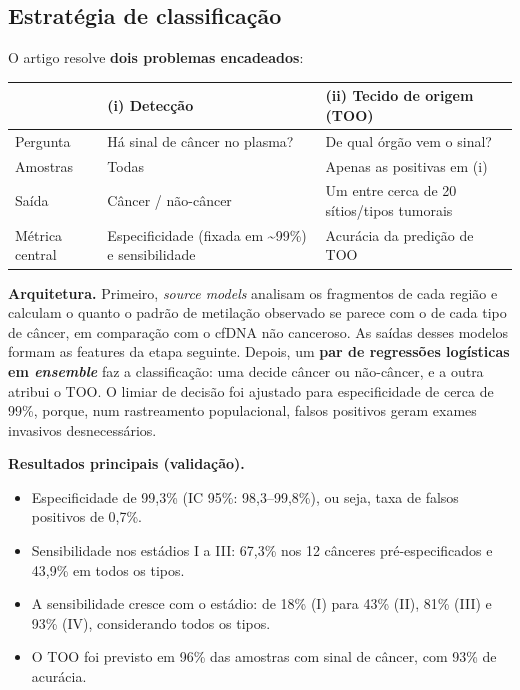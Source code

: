 \documentclass[11pt,a4paper]{article}
\providecommand{\tightlist}{\setlength{\itemsep}{0pt}\setlength{\parskip}{0pt}}
\begin{document}
\subsection{Estratégia de classificação}

O artigo resolve \textbf{dois problemas encadeados}:

{\def\LTcaptype{none} %
\begin{longtable}[]{@{}
  >{\raggedright\arraybackslash}p{}
  >{\raggedright\arraybackslash}p{}
  >{\raggedright\arraybackslash}p{}@{}}
\toprule\noalign{}
\begin{minipage}[b]{\linewidth}\raggedright
\end{minipage} & \begin{minipage}[b]{\linewidth}\raggedright
(i) Detecção
\end{minipage} & \begin{minipage}[b]{\linewidth}\raggedright
(ii) Tecido de origem (TOO)
\end{minipage} \\
\midrule\noalign{}
\endhead
\bottomrule\noalign{}
\endlastfoot
Pergunta & Há sinal de câncer no plasma? & De qual órgão vem o sinal? \\
Amostras & Todas & Apenas as positivas em (i) \\
Saída & Câncer / não-câncer & Um entre cerca de 20 sítios/tipos tumorais \\
Métrica central & Especificidade (fixada em \textasciitilde99\%) e sensibilidade
& Acurácia da predição de TOO \\
\end{longtable}
}

\textbf{Arquitetura.} Primeiro, \emph{source models} analisam os fragmentos de
cada região e calculam o quanto o padrão de metilação observado se parece com o
de cada tipo de câncer, em comparação com o cfDNA não canceroso. As saídas
desses modelos formam as features da etapa seguinte. Depois, um \textbf{par de
regressões logísticas em \emph{ensemble}} faz a classificação: uma decide câncer
ou não-câncer, e a outra atribui o TOO. O limiar de decisão foi ajustado para
especificidade de cerca de 99\%, porque, num rastreamento populacional, falsos
positivos geram exames invasivos desnecessários.

\textbf{Resultados principais (validação).}

\begin{itemize}
\tightlist
\item
  Especificidade de 99,3\% (IC 95\%: 98,3--99,8\%), ou seja, taxa de falsos
  positivos de 0,7\%.
\item
  Sensibilidade nos estádios I a III: 67,3\% nos 12 cânceres pré-especificados e
  43,9\% em todos os tipos.
\item
  A sensibilidade cresce com o estádio: de 18\% (I) para 43\% (II), 81\% (III) e
  93\% (IV), considerando todos os tipos.
\item
  O TOO foi previsto em 96\% das amostras com sinal de câncer, com 93\% de
  acurácia.
\end{itemize}
\end{document}
